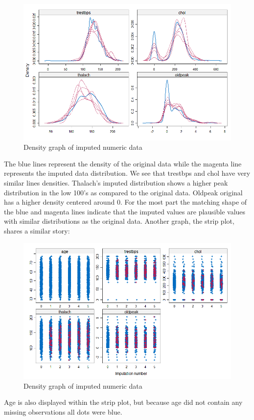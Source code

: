 \documentclass[12pt]{article}
\begin{document}
\begin{figure}[h!]
\begin{center}
\includegraphics[scale=.35]{density_impute_num}
\caption{Density graph of imputed numeric data}
\end{center}
\end{figure}
The blue lines represent the density of the original data while the magenta line represents the imputed data distribution. We see that trestbps and chol have very similar lines densities. Thalach's imputed distribution shows a higher peak distribution in the low 100's as compared to the original data. Oldpeak original has a higher density centered around 0. For the most part the matching shape of the blue and magenta lines indicate that the imputed values are plausible values with similar distributions as the original data. Another graph, the strip plot, shares a similar story:

\begin{figure}[h!]
\begin{center}
\includegraphics[scale=.35]{strip_impute_num}
\caption{Density graph of imputed numeric data}
\end{center}
\end{figure}
Age is also displayed within the strip plot, but because age did not contain any missing observations all dots were blue. 
\end{document}

